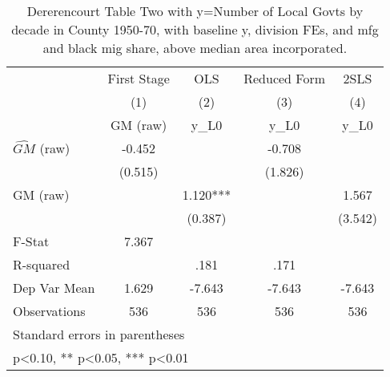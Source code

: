 \begin{table}[htbp]\centering
\def\sym#1{\ifmmode^{#1}\else\(^{#1}\)\fi}
\caption{Dererencourt Table Two with y=Number of Local Govts by decade in County 1950-70, with baseline y, division FEs, and mfg and black mig share, above median area incorporated.}
\begin{tabular}{l*{4}{c}}
\toprule
                    & First Stage   &         OLS   &Reduced Form   &        2SLS   \\
                    &\multicolumn{1}{c}{(1)}&\multicolumn{1}{c}{(2)}&\multicolumn{1}{c}{(3)}&\multicolumn{1}{c}{(4)}\\
                    &\multicolumn{1}{c}{GM  (raw)}&\multicolumn{1}{c}{y\_L0}&\multicolumn{1}{c}{y\_L0}&\multicolumn{1}{c}{y\_L0}\\
\midrule
$\hat{GM}$ (raw)    &      -0.452   &               &      -0.708   &               \\
                    &     (0.515)   &               &     (1.826)   &               \\
\addlinespace
GM  (raw)           &               &       1.120***&               &       1.567   \\
                    &               &     (0.387)   &               &     (3.542)   \\
\midrule
F-Stat              &       7.367   &               &               &               \\
R-squared           &               &        .181   &        .171   &               \\
Dep Var Mean        &       1.629   &      -7.643   &      -7.643   &      -7.643   \\
Observations        &         536   &         536   &         536   &         536   \\
\bottomrule
\multicolumn{5}{l}{\footnotesize Standard errors in parentheses}\\
\multicolumn{5}{l}{\footnotesize * p<0.10, ** p<0.05, *** p<0.01}\\
\end{tabular}
\end{table}
